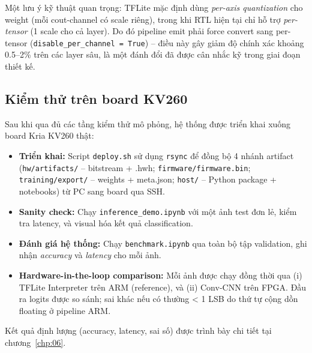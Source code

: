 Một lưu ý kỹ thuật quan trọng: TFLite mặc định dùng \textit{per-axis quantization} cho weight (mỗi cout-channel có scale riêng), trong khi RTL hiện tại chỉ hỗ trợ \textit{per-tensor} (1 scale cho cả layer). Do đó pipeline emit phải force convert sang per-tensor (\texttt{disable\_per\_channel = True}) -- điều này gây giảm độ chính xác khoảng 0.5--2\% trên các layer sâu, là một đánh đổi đã được cân nhắc kỹ trong giai đoạn thiết kế.

\subsection{Kiểm thử trên board KV260}
Sau khi qua đủ các tầng kiểm thử mô phỏng, hệ thống được triển khai xuống board Kria KV260 thật:

\begin{itemize}
    \item \textbf{Triển khai:} Script \texttt{deploy.sh} sử dụng \texttt{rsync} để đồng bộ 4 nhánh artifact (\texttt{hw/artifacts/} -- bitstream + .hwh; \texttt{firmware/firmware.bin}; \texttt{training/export/} -- weights + meta.json; \texttt{host/} -- Python package + notebooks) từ PC sang board qua SSH.
    \item \textbf{Sanity check:} Chạy \texttt{inference\_demo.ipynb} với một ảnh test đơn lẻ, kiểm tra latency, và visual hóa kết quả classification.
    \item \textbf{Đánh giá hệ thống:} Chạy \texttt{benchmark.ipynb} qua toàn bộ tập validation, ghi nhận \textit{accuracy} và \textit{latency} cho mỗi ảnh.
    \item \textbf{Hardware-in-the-loop comparison:} Mỗi ảnh được chạy đồng thời qua (i) TFLite Interpreter trên ARM (reference), và (ii) Conv-CNN trên FPGA. Đầu ra logits được so sánh; sai khác nếu có thường < 1 LSB do thứ tự cộng dồn floating ở pipeline ARM.
\end{itemize}

Kết quả định lượng (accuracy, latency, sai số) được trình bày chi tiết tại chương~\ref{chp:06}.
